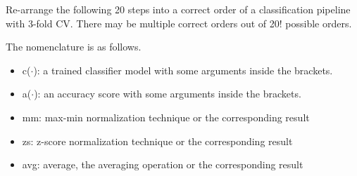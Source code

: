 \documentclass[12pt,a4paper]{article}
\begin{document}
Re-arrange the following 20 steps into a correct order of a classification pipeline with 3-fold CV.
There may be multiple correct orders out of 20! possible orders.

The nomenclature is as follows.

\begin{itemize}
  \item c($\cdot$): a trained classifier model with some arguments inside the brackets.
  \item a($\cdot$): an accuracy score with some arguments inside the brackets.
  \item mm: max-min normalization technique or the corresponding result
  \item zs: z-score normalization technique or the corresponding result
  \item avg: average, the averaging operation or the corresponding result
\end{itemize}
\end{document}

